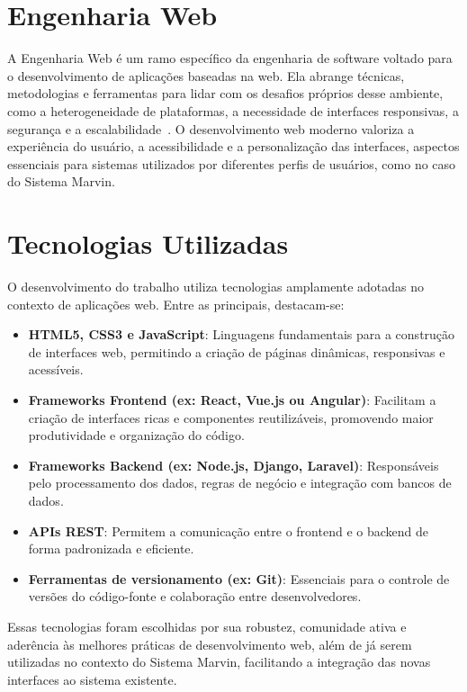 \section{Engenharia Web}
\label{sec-fundteo-engweb}

A Engenharia Web é um ramo específico da engenharia de software voltado para o desenvolvimento de aplicações baseadas na web. Ela abrange técnicas, metodologias e ferramentas para lidar com os desafios próprios desse ambiente, como a heterogeneidade de plataformas, a necessidade de interfaces responsivas, a segurança e a escalabilidade~\cite{gellersen2002web}. O desenvolvimento web moderno valoriza a experiência do usuário, a acessibilidade e a personalização das interfaces, aspectos essenciais para sistemas utilizados por diferentes perfis de usuários, como no caso do Sistema Marvin.

\section{Tecnologias Utilizadas}
\label{sec-fundteo-tecnologias}

O desenvolvimento do trabalho utiliza tecnologias amplamente adotadas no contexto de aplicações web. Entre as principais, destacam-se:

\begin{itemize}
	\item \textbf{HTML5, CSS3 e JavaScript}: Linguagens fundamentais para a construção de interfaces web, permitindo a criação de páginas dinâmicas, responsivas e acessíveis.
	\item \textbf{Frameworks Frontend (ex: React, Vue.js ou Angular)}: Facilitam a criação de interfaces ricas e componentes reutilizáveis, promovendo maior produtividade e organização do código.
	\item \textbf{Frameworks Backend (ex: Node.js, Django, Laravel)}: Responsáveis pelo processamento dos dados, regras de negócio e integração com bancos de dados.
	\item \textbf{APIs REST}: Permitem a comunicação entre o frontend e o backend de forma padronizada e eficiente.
	\item \textbf{Ferramentas de versionamento (ex: Git)}: Essenciais para o controle de versões do código-fonte e colaboração entre desenvolvedores.
\end{itemize}

Essas tecnologias foram escolhidas por sua robustez, comunidade ativa e aderência às melhores práticas de desenvolvimento web, além de já serem utilizadas no contexto do Sistema Marvin, facilitando a integração das novas interfaces ao sistema existente.


